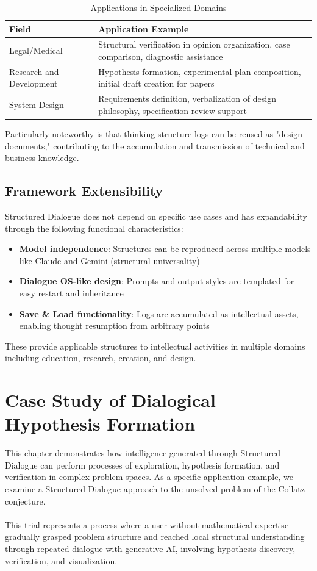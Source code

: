 \documentclass[11pt]{article}
\begin{document}
\begin{table}[htbp]
\centering
\caption{Applications in Specialized Domains}
\begin{tabular}{p{3cm}|p{9cm}}
\hline
\textbf{Field} & \textbf{Application Example} \\
\hline
Legal/Medical & Structural verification in opinion organization, case comparison, diagnostic assistance \\
\hline
Research and Development & Hypothesis formation, experimental plan composition, initial draft creation for papers \\
\hline
System Design & Requirements definition, verbalization of design philosophy, specification review support \\
\hline
\end{tabular}
\label{tab:specialized-domains}
\end{table}

Particularly noteworthy is that thinking structure logs can be reused as "design documents," contributing to the accumulation and transmission of technical and business knowledge.
\subsection{Framework Extensibility}
Structured Dialogue does not depend on specific use cases and has expandability through the following functional characteristics:

\begin{itemize}
\item \textbf{Model independence}: Structures can be reproduced across multiple models like Claude and Gemini (structural universality)
\item \textbf{Dialogue OS-like design}: Prompts and output styles are templated for easy restart and inheritance
\item \textbf{Save \& Load functionality}: Logs are accumulated as intellectual assets, enabling thought resumption from arbitrary points
\end{itemize}

These provide applicable structures to intellectual activities in multiple domains including education, research, creation, and design.
\section{Case Study of Dialogical Hypothesis Formation}
This chapter demonstrates how intelligence generated through Structured Dialogue can perform processes of exploration, hypothesis formation, and verification in complex problem spaces. As a specific application example, we examine a Structured Dialogue approach to the unsolved problem of the Collatz conjecture. \\
\\
This trial represents a process where a user without mathematical expertise gradually grasped problem structure and reached local structural understanding through repeated dialogue with generative AI, involving hypothesis discovery, verification, and visualization.
\end{document}
